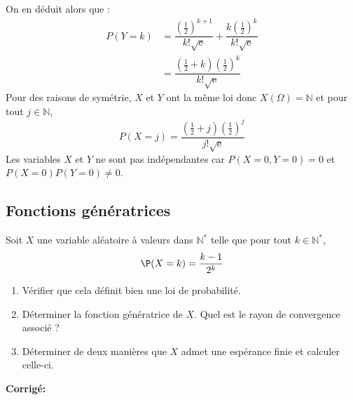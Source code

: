 \documentclass[a4paper,twoside,french,11pt]{VcCours}
\newcommand{\corr}{\textbf{Corrigé:}}
\begin{document}
On en déduit alors que :
\begin{align*}
P(Y=k) & =\dfrac{\left(\tfrac{1}{2} \right)^{k+1}}{k!\sqrt{\mathrm{e}}}+\dfrac{k\left(\tfrac{1}{2} \right)^{k}}{k!\sqrt{\mathrm{e}}} \\
&= \dfrac{(\tfrac{1}{2}+k)\left(\tfrac{1}{2} \right)^{k}}{k!\sqrt{\mathrm{e}}}
\end{align*}
Pour des raisons de symétrie, $X$ et $Y$ ont la même loi donc $X(\Omega)=\mathbb{N}$ et pour tout $ j \in {\mathbb{N}}$, 
$$P(X=j)=\dfrac{(\tfrac{1}{2}+j)\left(\tfrac{1}{2} \right)^{j}}{j!\sqrt{\mathrm{e}}}$$
Les variables $X$ et $Y$ ne sont pas indépendantes car $P(X=0,Y=0)=0$ et $P(X=0)P(Y=0)\neq 0$.


\subsection{Fonctions génératrices}


\begin{Exercice}{}  Soit $X$ une variable aléatoire à valeurs dans $\mathbb{N}^*$ telle que pour tout $k \in \mathbb{N}^*$,
$$ \P(X=k) = \dfrac{k-1}{2^k}$$

\begin{enumerate}
\item Vérifier que cela définit bien une loi de probabilité.
\item Déterminer la fonction génératrice de $X$. Quel est le rayon de convergence associé ?
\item Déterminer de deux manières que $X$ admet une espérance finie et calculer celle-ci.
\end{enumerate}
\end{Exercice}

\corr 
\end{document}
